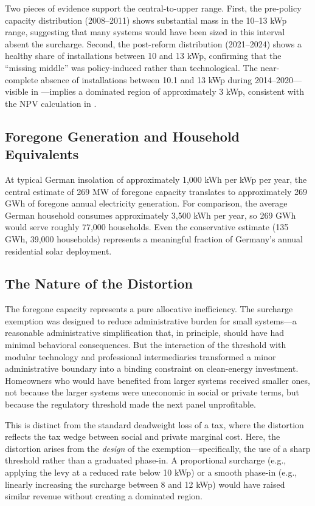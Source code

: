 \documentclass[12pt]{article}
\begin{document}
Two pieces of evidence support the central-to-upper range. First, the pre-policy capacity distribution (2008--2011) shows substantial mass in the 10--13 kWp range, suggesting that many systems would have been sized in this interval absent the surcharge. Second, the post-reform distribution (2021--2024) shows a healthy share of installations between 10 and 13 kWp, confirming that the ``missing middle'' was policy-induced rather than technological. The near-complete absence of installations between 10.1 and 13 kWp during 2014--2020---visible in ---implies a dominated region of approximately 3 kWp, consistent with the NPV calculation in .

\subsection{Foregone Generation and Household Equivalents}

At typical German insolation of approximately 1,000 kWh per kWp per year, the central estimate of 269 MW of foregone capacity translates to approximately 269 GWh of foregone annual electricity generation. For comparison, the average German household consumes approximately 3,500 kWh per year, so 269 GWh would serve roughly 77,000 households. Even the conservative estimate (135 GWh, 39,000 households) represents a meaningful fraction of Germany's annual residential solar deployment.

\subsection{The Nature of the Distortion}

The foregone capacity represents a pure allocative inefficiency. The surcharge exemption was designed to reduce administrative burden for small systems---a reasonable administrative simplification that, in principle, should have had minimal behavioral consequences. But the interaction of the threshold with modular technology and professional intermediaries transformed a minor administrative boundary into a binding constraint on clean-energy investment. Homeowners who would have benefited from larger systems received smaller ones, not because the larger systems were uneconomic in social or private terms, but because the regulatory threshold made the next panel unprofitable.

This is distinct from the standard deadweight loss of a tax, where the distortion reflects the tax wedge between social and private marginal cost. Here, the distortion arises from the \textit{design} of the exemption---specifically, the use of a sharp threshold rather than a graduated phase-in. A proportional surcharge (e.g., applying the levy at a reduced rate below 10 kWp) or a smooth phase-in (e.g., linearly increasing the surcharge between 8 and 12 kWp) would have raised similar revenue without creating a dominated region.
\end{document}
